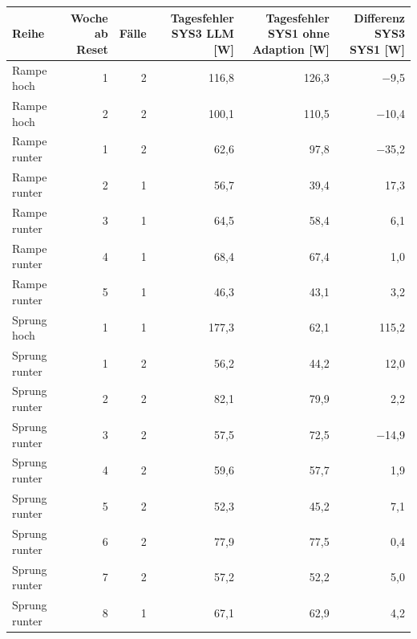 \begin{tabular}{lrrrrr}
\toprule
Reihe & Woche ab Reset & Fälle & Tagesfehler SYS3 LLM [W] & Tagesfehler SYS1 ohne Adaption [W] & Differenz SYS3 \textminus{} SYS1 [W] \\
\midrule
Rampe hoch & 1 & 2 & 116,8 & 126,3 & $-$9,5 \\
Rampe hoch & 2 & 2 & 100,1 & 110,5 & $-$10,4 \\
Rampe runter & 1 & 2 & 62,6 & 97,8 & $-$35,2 \\
Rampe runter & 2 & 1 & 56,7 & 39,4 & 17,3 \\
Rampe runter & 3 & 1 & 64,5 & 58,4 & 6,1 \\
Rampe runter & 4 & 1 & 68,4 & 67,4 & 1,0 \\
Rampe runter & 5 & 1 & 46,3 & 43,1 & 3,2 \\
Sprung hoch & 1 & 1 & 177,3 & 62,1 & 115,2 \\
Sprung runter & 1 & 2 & 56,2 & 44,2 & 12,0 \\
Sprung runter & 2 & 2 & 82,1 & 79,9 & 2,2 \\
Sprung runter & 3 & 2 & 57,5 & 72,5 & $-$14,9 \\
Sprung runter & 4 & 2 & 59,6 & 57,7 & 1,9 \\
Sprung runter & 5 & 2 & 52,3 & 45,2 & 7,1 \\
Sprung runter & 6 & 2 & 77,9 & 77,5 & 0,4 \\
Sprung runter & 7 & 2 & 57,2 & 52,2 & 5,0 \\
Sprung runter & 8 & 1 & 67,1 & 62,9 & 4,2 \\
\bottomrule
\end{tabular}

